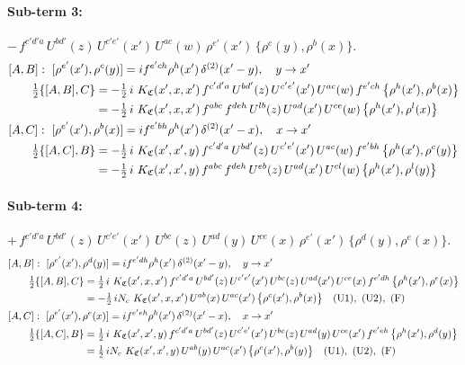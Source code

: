 \documentclass[10pt]{article}
\numberwithin{equation}{section}
\begin{document}
\paragraph{Sub-term 3:} $-\,f^{c'd'a}\,U^{bd'}(z)\,U^{c'e'}(x')\,U^{ac}(w)\,\rho^{e'}(x')\,\big\{\rho^{c}(y),\rho^{b}(x)\big\}$.
\begin{align}
&[A,B]:\ [\rho^{e'}(x'),\rho^{c}(y)]=i f^{e'ch}\rho^{h}(x')\,\delta^{(2)}(x'-y),\quad y\to x'\notag\\
&\qquad \tfrac12\{[A,B],C\}=-\tfrac12\,i\,\,K_{\mathfrak C}(x',x,x')\,f^{c'd'a}\,U^{bd'}(z)\,U^{c'e'}(x')\,U^{ac}(w)\,f^{e'ch}\,\big\{\rho^{h}(x'),\rho^{b}(x)\big\}\notag\\
&\qquad\phantom{\tfrac12\{[A,B],C\}}=-\tfrac12\,i\,\,K_{\mathfrak C}(x',x,x')\,f^{abc}\,f^{deh}\,U^{lb}(z)\,U^{ad}(x')\,U^{ce}(w)\,\big\{\rho^{h}(x'),\rho^{l}(x)\big\}
\label{R:eq:GIII.III-3-AB}\\
&[A,C]:\ [\rho^{e'}(x'),\rho^{b}(x)]=i f^{e'bh}\rho^{h}(x')\,\delta^{(2)}(x'-x),\quad x\to x'\notag\\
&\qquad \tfrac12\{[A,C],B\}=-\tfrac12\,i\,\,K_{\mathfrak C}(x',x',y)\,f^{c'd'a}\,U^{bd'}(z)\,U^{c'e'}(x')\,U^{ac}(w)\,f^{e'bh}\,\big\{\rho^{h}(x'),\rho^{c}(y)\big\}\notag\\
&\qquad\phantom{\tfrac12\{[A,C],B\}}=-\tfrac12\,i\,\,K_{\mathfrak C}(x',x',y)\,f^{abc}\,f^{deh}\,U^{eb}(z)\,U^{ad}(x')\,U^{cl}(w)\,\big\{\rho^{h}(x'),\rho^{l}(y)\big\}
\label{R:eq:GIII.III-3-AC}
\end{align}
\paragraph{Sub-term 4:} $+\,f^{c'd'a}\,U^{bd'}(z)\,U^{c'e'}(x')\,U^{bc}(z)\,U^{ad}(y)\,U^{ce}(x)\,\rho^{e'}(x')\,\big\{\rho^{d}(y),\rho^{e}(x)\big\}$.
\begin{align}
&[A,B]:\ [\rho^{e'}(x'),\rho^{d}(y)]=i f^{e'dh}\rho^{h}(x')\,\delta^{(2)}(x'-y),\quad y\to x'\notag\\
&\qquad \tfrac12\{[A,B],C\}=\tfrac12\,i\,\,K_{\mathfrak C}(x',x,x')\,f^{c'd'a}\,U^{bd'}(z)\,U^{c'e'}(x')\,U^{bc}(z)\,U^{ad}(x')\,U^{ce}(x)\,f^{e'dh}\,\big\{\rho^{h}(x'),\rho^{e}(x)\big\}\notag\\
&\qquad\phantom{\tfrac12\{[A,B],C\}}=-\tfrac12\,i N_{c}\,\,K_{\mathfrak C}(x',x,x')\,U^{ab}(x)\,U^{ac}(x')\,\big\{\rho^{c}(x'),\rho^{b}(x)\big\}\quad\text{(U1)},\ \text{(U2)},\ \text{(F)}
\label{R:eq:GIII.III-4-AB}\\
&[A,C]:\ [\rho^{e'}(x'),\rho^{e}(x)]=i f^{e'eh}\rho^{h}(x')\,\delta^{(2)}(x'-x),\quad x\to x'\notag\\
&\qquad \tfrac12\{[A,C],B\}=\tfrac12\,i\,\,K_{\mathfrak C}(x',x',y)\,f^{c'd'a}\,U^{bd'}(z)\,U^{c'e'}(x')\,U^{bc}(z)\,U^{ad}(y)\,U^{ce}(x')\,f^{e'eh}\,\big\{\rho^{h}(x'),\rho^{d}(y)\big\}\notag\\
&\qquad\phantom{\tfrac12\{[A,C],B\}}=\tfrac12\,i N_{c}\,\,K_{\mathfrak C}(x',x',y)\,U^{ab}(y)\,U^{ac}(x')\,\big\{\rho^{c}(x'),\rho^{b}(y)\big\}\quad\text{(U1)},\ \text{(U2)},\ \text{(F)}
\label{R:eq:GIII.III-4-AC}
\end{align}
\end{document}
